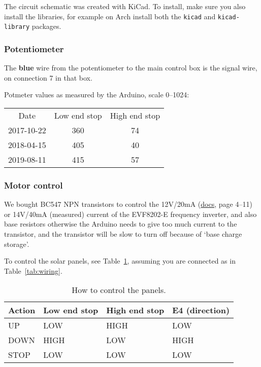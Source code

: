 The circuit schematic was created with KiCad.
To install, make sure you also install the libraries, for example on Arch install both the \verb|kicad| and \verb|kicad-library| packages.

\subsubsection{Potentiometer}
The \textbf{blue} wire from the potentiometer to the main control box is the signal wire, on connection 7 in that box.

Potmeter values as measured by the Arduino, scale 0--1024:

\begin{tabular}{ccc}
	Date & Low end stop & High end stop \\
	2017-10-22 & 360 & 74 \\
	2018-04-15 & 405 & 40 \\
	2019-08-11 & 415 & 57 \\
\end{tabular}


\subsubsection{Motor control}
We bought BC547 NPN transistors to control the 12V/20mA (\href{http://download.lenze.com/TD/8201-8204__Inverter__v02-08__EN.pdf }{docs}, page 4--11) or 14V/40mA (measured) current of the EVF8202-E frequency inverter, and also base resistors otherwise the Arduino needs to give too much current to the transistor, and the transistor will be slow to turn off because of `base charge storage'.

To control the solar panels, see Table~\ref{tab:control}, assuming you are connected as in Table~\ref{tab:wiring}.

\begin{table}
    \centering
    \begin{tabular}{llll}
        \toprule
        \textbf{Action} & \textbf{Low end stop} & \textbf{High end stop} & \textbf{E4 (direction)} \\
        \midrule
        UP & LOW & HIGH & LOW \\
        DOWN & HIGH & LOW & HIGH \\
        STOP & LOW & LOW & LOW \\
        \bottomrule
    \end{tabular}
    \caption{How to control the panels.}
    \label{tab:control}
\end{table}


